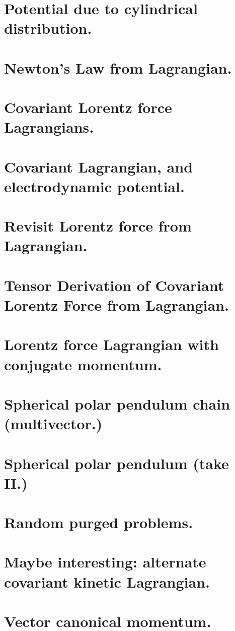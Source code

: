 \chapter{Potential due to cylindrical distribution.}
   
\chapter{Newton's Law from Lagrangian.}
\chapter{Covariant Lorentz force Lagrangians.}
   
\chapter{Covariant Lagrangian, and electrodynamic potential.}
\chapter{Revisit Lorentz force from Lagrangian.}
\chapter{Tensor Derivation of Covariant Lorentz Force from Lagrangian.}
\chapter{Lorentz force Lagrangian with conjugate momentum.}
\chapter{Spherical polar pendulum chain (multivector.)}
   
\chapter{Spherical polar pendulum (take II.)}
   
\chapter{Random purged problems.}
   
\chapter{Maybe interesting: alternate covariant kinetic Lagrangian.}
   
\chapter{Vector canonical momentum.}

\EndNoBibArticle
